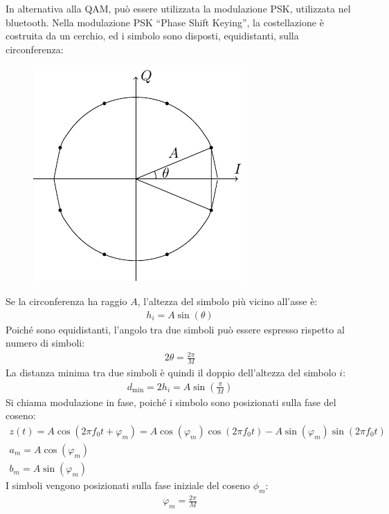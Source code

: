 \documentclass{article}
\numberwithin{equation}{subsection}
\begin{document}
In alternativa alla QAM, può essere utilizzata la modulazione PSK, utilizzata nel bluetooth. 
Nella modulazione PSK ``Phase Shift Keying'', la costellazione è costruita da un cerchio, ed i simbolo sono disposti, equidistanti, sulla circonferenza: 
\begin{figure}[H]%
    \centering
    \includegraphics{8psk.pdf}%
\end{figure}
Se la circonferenza ha raggio $A$, l'altezza del simbolo più vicino all'asse è:
\begin{gather*}
    h_i=A\sin(\theta)
\end{gather*}
Poiché sono equidistanti, l'angolo tra due simboli può essere espresso rispetto al numero di simboli:
\begin{gather*}
    2\theta=\displaystyle\frac{2\pi}{M}
\end{gather*}
La distanza minima tra due simboli è quindi il doppio dell'altezza del simbolo $i$: 
\begin{gather*}
    d_{\min}=2h_i=A\sin\left(\displaystyle\frac{\pi}{M}\right)
\end{gather*}
Si chiama modulazione in fase, poiché i simbolo sono posizionati sulla fase del coseno:
\begin{gather*}
    z(t)=A\cos(2\pi f_0 t+\varphi_m)=A\cos(\varphi_m)\cos(2\pi f_0t)-A\sin(\varphi_m)\sin(2\pi f_0t)\\
    a_m=A\cos(\varphi_m)\\
    b_m=A\sin(\varphi_m)
\end{gather*}
I simboli vengono posizionati sulla fase iniziale del coseno $\phi_m$:
\begin{gather*}
    \varphi_m=\displaystyle\frac{2\pi}{M}
\end{gather*}
\end{document}
